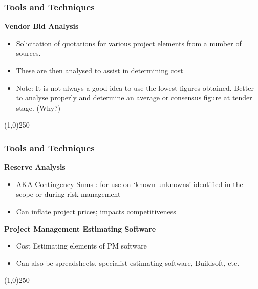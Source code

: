 \begin{frame}
\frametitle{Tools and Techniques}
 
\textbf{Vendor Bid Analysis}
	\begin{itemize}
		\item Solicitation of quotations for various project elements from a number of sources.
		\item These are then analysed to assist in determining cost
		\item Note: It is not always a good idea to use the lowest figures obtained.  Better to analyse properly and determine an average or consensus figure at tender stage. (Why?)
	\end{itemize}
\end{frame}
\begin{center}\line(1,0){250}\end{center}


\begin{frame}
\frametitle{Tools and Techniques}
\textbf{Reserve Analysis}
\begin{itemize}
	\item AKA Contingency Sums : for use on ‘known-unknowns’ identified in the scope or during risk management
	\item Can inflate project prices; impacts competitiveness
\end{itemize}
\textbf{Project Management Estimating Software}
\begin{itemize}
	\item Cost Estimating elements of PM software
	\item Can also be spreadsheets, specialist estimating software, Buildsoft, etc. 
\end{itemize}
\end{frame}
\begin{center}\line(1,0){250}\end{center}






